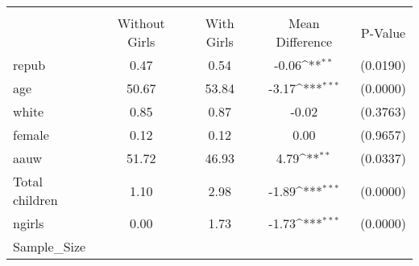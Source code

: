 {
\def\sym#1{\ifmmode^{#1}\else\(^{#1}\)\fi}
\begin{tabular}{l*{1}{cccc}}
\toprule
                &\multicolumn{4}{c}{}                            \\
                &Without Girls&With Girls&Mean Difference         &  P-Value\\
\midrule
repub           &     0.47&     0.54&    -0.06\sym{**} & (0.0190)\\
\addlinespace
age             &    50.67&    53.84&    -3.17\sym{***}& (0.0000)\\
\addlinespace
white           &     0.85&     0.87&    -0.02         & (0.3763)\\
\addlinespace
female          &     0.12&     0.12&     0.00         & (0.9657)\\
\addlinespace
aauw            &    51.72&    46.93&     4.79\sym{**} & (0.0337)\\
\addlinespace
Total children  &     1.10&     2.98&    -1.89\sym{***}& (0.0000)\\
\addlinespace
ngirls          &     0.00&     1.73&    -1.73\sym{***}& (0.0000)\\
\midrule
Sample\_Size     &         &         &                  &         \\
\bottomrule
\end{tabular}
}

